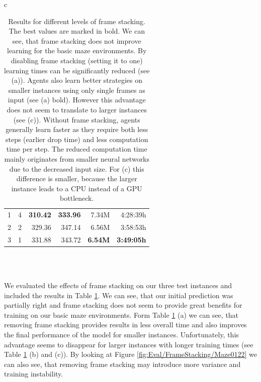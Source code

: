 \begin{table}[htp]
\begin{center}
\begin{tabular}{c}
\begin{tabular}{rcrrrr}
                \midrule
                1 & 4 & \textbf{310.42} & \textbf{333.96} & 7.34M & 4:28:39h \\
                2 & 2 & 329.36 & 347.14 & 6.56M & 3:58:53h \\
                3 & 1 & 331.88 & 343.72 & \textbf{6.54M} & \textbf{3:49:05h} \\
                \bottomrule
            \end{tabular} \\
             \\
        \end{tabular}
        
    \end{center}
    \caption[Evaluation Results for Different Levels of Frame Stacking]{Results for different levels of frame stacking. The best values are marked in bold. We can see, that frame stacking does not improve learning for the basic maze environments. By disabling frame stacking (setting it to one) learning times can be significantly reduced (see (a)). Agents also learn better strategies on smaller instances using only single frames as input (see (a) bold). However this advantage does not seem to translate to larger instances (see (c)). Without frame stacking, agents generally learn faster as they require both less steps (earlier drop time) and less computation time per step. The reduced computation time mainly originates from smaller neural networks due to the decreased input size. For (c) this difference is smaller, because the larger instance leads to a CPU instead of a GPU bottleneck.} \label{tab:Eval/FrameStacking}
\end{table}

We evaluated the effects of frame stacking on our three test instances and included the results  in Table \ref{tab:Eval/FrameStacking}. We can see, that our initial prediction was partially right and frame stacking does not seem to provide great benefits for training on our basic maze environments. Form Table \ref{tab:Eval/FrameStacking} (a) we can see, that removing frame stacking provides results in less overall time and also improves the final performance of the model for smaller instances. Unfortunately, this advantage seems to disappear for larger instances with longer training times (see Table \ref{tab:Eval/FrameStacking} (b) and (c)). By looking at Figure \ref{fig:Eval/FrameStacking/Maze0122} we can also see, that removing frame stacking may introduce more variance and training instability. 


